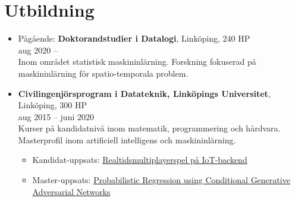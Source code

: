 \documentclass[12pt]{article}
\newcommand{\text}[2]{#2}
\newcommand{\text}[2]{#1}
\begin{document}
\section*{\text{Education}{Utbildning}}
\begin{itemize}
    \item \text{
            In progress: \textbf{Doctoral Studies in Computer Science}, Linköping, 240 ECTS\\
        Aug 2020 -- \\
        In the general area of statistical machine learning. Research focused on machine learning for spatio-temporal problems.
        }{
            Pågående: \textbf{Doktorandstudier i Datalogi}, Linköping, 240 HP\\
            aug 2020 -- \\
            Inom området statistisk maskininlärning. Forskning fokuserad på maskininlärning för spatio-temporala problem.
        }
    \item \text{
            \textbf{Master programme in Computer Science and Engineering (Swedish Civilingenjörsprogram), Linköping University}, Linköping, 300 ECTS\\
        Aug 2015 -- June 2020\\
        }{
            \textbf{Civilingenjörsprogram i Datateknik, Linköpings Universitet}, \\ Linköping, 300 HP\\
        aug 2015 -- juni 2020\\
        }
        \text{
            Bachelor courses in mathematics, programming and electrical engineering. Master focused on machine learning, statistics and AI.
        }{
            Kurser på kandidatnivå inom matematik, programmering och hårdvara. Masterprofil inom artificiell intelligens och maskininlärning.
        }
        \begin{itemize}
            \item \text{
                    Bachelor thesis: \href{http://urn.kb.se/resolve?urn=urn:nbn:se:liu:diva-149042}{Real-time Multiplayer Game on IoT-backend}
                }{
                    Kandidat-uppsats: \href{http://urn.kb.se/resolve?urn=urn:nbn:se:liu:diva-149042}{Realtidsmultiplayerspel på IoT-backend}
                }
            \item \text{
                    Master thesis: \href{http://urn.kb.se/resolve?urn=urn:nbn:se:liu:diva-166637}{Probabilistic Regression using Conditional Generative Adversarial Networks}
                }{
                    Master-uppsats: \href{http://urn.kb.se/resolve?urn=urn:nbn:se:liu:diva-166637}{Probabilistic Regression using Conditional Generative Adversarial Networks}
                }
        \end{itemize}


\end{itemize}
\end{document}
